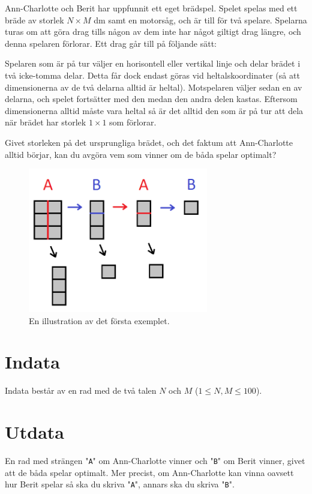 Ann-Charlotte och Berit har uppfunnit ett eget brädspel. Spelet spelas med ett
bräde av storlek $N \times M$ dm samt en motorsåg, och är till för två spelare.
Spelarna turas om att göra drag tills någon av dem inte har något giltigt drag
längre, och denna spelaren förlorar. Ett drag går till på följande sätt:

Spelaren som är på tur väljer en horisontell eller vertikal linje och delar
brädet i två icke-tomma delar. Detta får dock endast göras vid heltalskoordinater (så att
dimensionerna av de två delarna alltid är heltal). Motspelaren väljer sedan en av
delarna, och spelet fortsätter med den medan den andra delen kastas. Eftersom
dimensionerna alltid måste vara heltal så är det alltid den som är på tur att
dela när brädet har storlek $1 \times 1$ som förlorar.

Givet storleken på det ursprungliga brädet, och det faktum att Ann-Charlotte
alltid börjar, kan du avgöra vem som vinner om de båda spelar optimalt?

\begin{figure}[ht!]
\centering
\includegraphics[width=0.7\textwidth]{bradspelet.png}
\caption{En illustration av det första exemplet.}
\label{overflow}
\end{figure}

\section*{Indata}
Indata består av en rad med de två talen $N$ och $M$ ($1 \le N,M \le 100$).

\section*{Utdata}

En rad med strängen "\texttt{A}" om Ann-Charlotte vinner och "\texttt{B}" om
Berit vinner, givet att de båda spelar optimalt. Mer precist, om Ann-Charlotte
kan vinna oavsett hur Berit spelar så ska du skriva "\texttt{A}", annars ska du
skriva "\texttt{B}".

